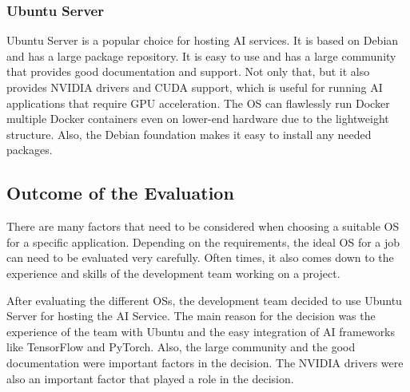 \cite{LinuxForServerRedhat}

\subsubsection{Ubuntu Server}

Ubuntu Server is a popular choice for hosting AI services. It is based on Debian and has a large package repository. It is easy to use and has a large community that provides good documentation and support. Not only that, but it also provides NVIDIA drivers and CUDA support, which is useful for running AI applications that require GPU acceleration.
The OS can flawlessly run Docker multiple Docker containers even on lower-end hardware due to the lightweight structure. Also, the Debian foundation makes it easy to install any needed packages. 


\cite{lacroix2022mastering}

\subsection {Outcome of the Evaluation}

There are many factors that need to be considered when choosing a suitable OS for a specific application. Depending on the requirements, the ideal OS for a job can need to be evaluated very carefully. 
Often times, it also comes down to the experience and skills of the development team working on a project. 

After evaluating the different OSs, the development team decided to use Ubuntu Server for hosting the AI Service.
The main reason for the decision was the experience of the team with Ubuntu and the easy integration of AI frameworks like TensorFlow and PyTorch.
Also, the large community and the good documentation were important factors in the decision. The NVIDIA drivers were also an important factor that played a role in the decision.





